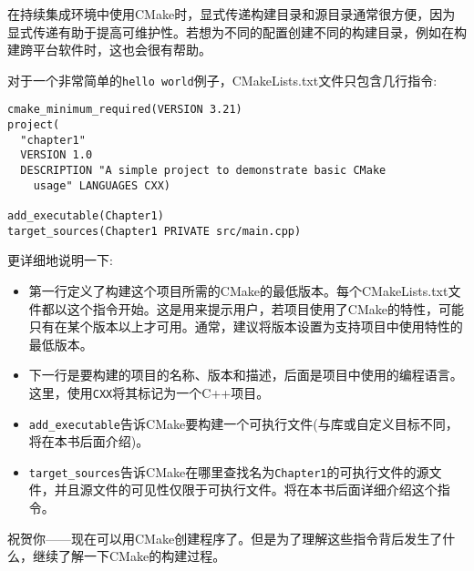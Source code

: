 在持续集成环境中使用CMake时，显式传递构建目录和源目录通常很方便，因为显式传递有助于提高可维护性。若想为不同的配置创建不同的构建目录，例如在构建跨平台软件时，这也会很有帮助。


对于一个非常简单的\texttt{hello world}例子，CMakeLists.txt文件只包含几行指令:

\begin{lstlisting}[style=styleCMake]
cmake_minimum_required(VERSION 3.21)
project(
  "chapter1"
  VERSION 1.0
  DESCRIPTION "A simple project to demonstrate basic CMake
    usage" LANGUAGES CXX)

add_executable(Chapter1)
target_sources(Chapter1 PRIVATE src/main.cpp)
\end{lstlisting}

更详细地说明一下:

\begin{itemize}
\item 
第一行定义了构建这个项目所需的CMake的最低版本。每个CMakeLists.txt文件都以这个指令开始。这是用来提示用户，若项目使用了CMake的特性，可能只有在某个版本以上才可用。通常，建议将版本设置为支持项目中使用特性的最低版本。

\item 
下一行是要构建的项目的名称、版本和描述，后面是项目中使用的编程语言。这里，使用\texttt{CXX}将其标记为一个C++项目。

\item 
\texttt{add\_executable}告诉CMake要构建一个可执行文件(与库或自定义目标不同，将在本书后面介绍)。

\item 
\texttt{target\_sources}告诉CMake在哪里查找名为\texttt{Chapter1}的可执行文件的源文件，并且源文件的可见性仅限于可执行文件。将在本书后面详细介绍这个指令。
\end{itemize}

祝贺你——现在可以用CMake创建程序了。但是为了理解这些指令背后发生了什么，继续了解一下CMake的构建过程。































